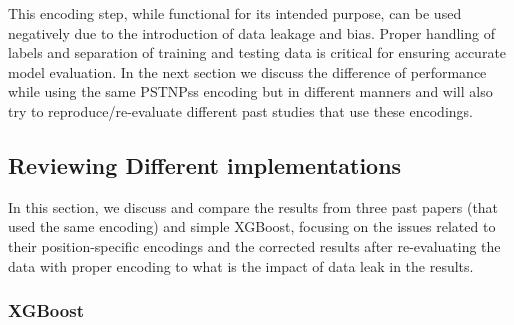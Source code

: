       This encoding step, while functional for its intended purpose, can be used negatively due to the introduction of data leakage and bias.
      Proper handling of labels and separation of training and testing data is critical for ensuring accurate model evaluation.
      In the next section we discuss the difference of performance while using the same PSTNPss encoding but in different manners and will also try to reproduce/re-evaluate different past studies that use these encodings.

  \subsection{Reviewing Different implementations}\label{subsec:reviewing-different-implementations}
    In this section, we discuss and compare the results from three past papers (that used the same encoding) and simple XGBoost, focusing on the issues related to their position-specific encodings and the corrected results after re-evaluating the data with proper encoding to what is the impact of data leak in the results.

    \subsubsection{XGBoost}

